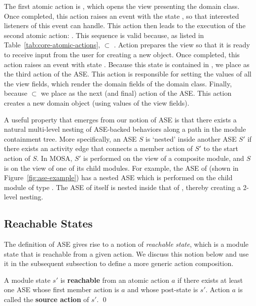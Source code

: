 The first atomic action is , which opens the view presenting the domain class. Once completed, this action raises an event with the state , so that interested listeners of this event can handle. This action then leads to the execution of the second atomic action: . This sequence is valid because, as listed in Table~\ref{tab:core-atomic-actions},  $\subset$ . Action  prepares the view so that it is ready to receive input from the user for creating a new object. Once completed, this action raises an event with state .
%
Because this state is contained in , we place  as the third action of the ASE. This action is responsible for setting the values of all the view fields, which render the domain fields of the domain class.
Finally, because  $\subset$  we place  as the next (and final) action of the ASE. This action creates a new domain object (using values of the view fields).

A useful property that emerges from our notion of ASE is that there exists a natural multi-level nesting of ASE-backed behaviors along a path in the module containment tree. More specifically, an ASE $S$ is `nested' inside another ASE $S'$ if there exists an activity edge that connects a member action of $S'$ to the start action of $S$. In MOSA, $S'$ is performed on the view of a composite module, and $S$ is on the view of one of its child modules.
%
For example, the ASE of  (shown in Figure~\ref{fig:ase-example}) has a nested ASE which is performed on the child module of type . The ASE of  itself is nested inside that of , thereby creating a 2-level nesting.
\subsection{Reachable States} \label{sect:arch-reachable-states}
The definition of ASE gives rise to a notion of \textit{reachable state}, which is a module state that is reachable from a given action. We discuss this notion below and use it in the subsequent subsection to define a more generic action composition.
%
\begin{definition} \label{def:reachable-state}
A module state $s'$ is \textbf{reachable} from an atomic action $a$ if there exists at least one ASE whose first member action is $a$ and whose post-state is $s'$. Action $a$ is called the \textbf{source action} of $s'$. \qed
\end{definition}

